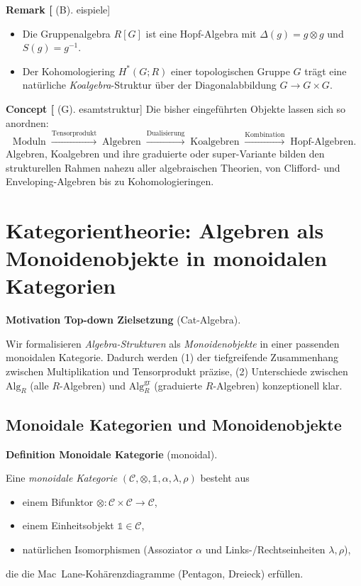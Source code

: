 \documentclass[10pt, letterpaper]{article}
\newcommand{\Alg}{\mathrm{Alg}}
\newcommand{\CustomHeading}[3]{%
  \par\medskip\noindent%
  \textbf{#1 #2} \textnormal{(#3)}.\enskip%
}
\newenvironment{DEF}[2]{\begin{unitbox}\CustomHeading{Definition}{#1}{#2}}{\end{unitbox}}
\newenvironment{REM}[2]{\begin{unitbox}\CustomHeading{Remark}{#1}{#2}}{\end{unitbox}}
\newenvironment{CONC}[2]{\begin{unitbox}\CustomHeading{Concept}{#1}{#2}}{\end{unitbox}}
\newenvironment{MOT}[2]{\begin{unitbox}\CustomHeading{Motivation}{#1}{#2}}{\end{unitbox}}
\begin{document}
\begin{REM}[Beispiele]
\begin{itemize}[leftmargin=*]
\item Die Gruppenalgebra \(R[G]\) ist eine Hopf-Algebra
mit \(\Delta(g)=g\otimes g\) und \(S(g)=g^{-1}\).
\item Der Kohomologiering \(H^\ast(G;R)\) einer topologischen Gruppe \(G\)
trägt eine natürliche \emph{Koalgebra}-Struktur über der Diagonalabbildung \(G\to G\times G\).
\end{itemize}
\end{REM}

\begin{CONC}[Gesamtstruktur]
Die bisher eingeführten Objekte lassen sich so anordnen:
\[
\text{Moduln} \;\xrightarrow{\text{Tensorprodukt}}\;
\text{Algebren}
\;\xrightarrow{\text{Dualisierung}}\;
\text{Koalgebren}
\;\xrightarrow{\text{Kombination}}\;
\text{Hopf-Algebren}.
\]
Algebren, Koalgebren und ihre graduierte oder super-Variante
bilden den strukturellen Rahmen nahezu aller algebraischen Theorien,
von Clifford- und Enveloping-Algebren bis zu Kohomologieringen.
\end{CONC}

\section{Kategorientheorie: Algebren als Monoidenobjekte in monoidalen Kategorien}
\label{sec:cat-monoids}

\begin{MOT}{Top-down Zielsetzung}{Cat-Algebra}
Wir formalisieren \emph{Algebra-Strukturen} als \emph{Monoidenobjekte} in einer passenden monoidalen Kategorie. Dadurch werden
(1) der tiefgreifende Zusammenhang zwischen Multiplikation und Tensorprodukt präzise,
(2) Unterschiede zwischen \(\Alg_R\) (alle \(R\)-Algebren) und \(\Alg_R^{\mathrm{gr}}\) (graduierte \(R\)-Algebren) konzeptionell klar.
\end{MOT}

\subsection{Monoidale Kategorien und Monoidenobjekte}

\begin{DEF}{Monoidale Kategorie}{monoidal}
Eine \emph{monoidale Kategorie} \((\mathcal{C},\otimes,\mathbb{1},\alpha,\lambda,\rho)\) besteht aus
\begin{itemize}[leftmargin=*]
  \item einem Bifunktor \(\otimes:\mathcal{C}\times\mathcal{C}\to\mathcal{C}\),
  \item einem Einheitsobjekt \(\mathbb{1}\in \mathcal{C}\),
  \item natürlichen Isomorphismen (Assoziator \(\alpha\) und Links-/Rechtseinheiten \(\lambda,\rho\)),
\end{itemize}
die die Mac~Lane-Kohärenzdiagramme (Pentagon, Dreieck) erfüllen.
\end{DEF}
\end{document}
